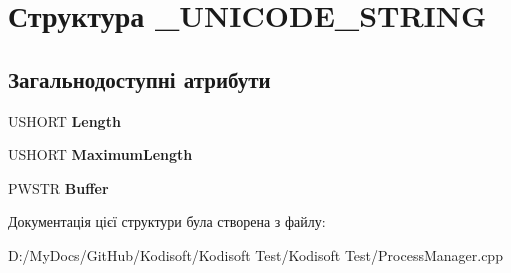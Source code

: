 \hypertarget{struct___u_n_i_c_o_d_e___s_t_r_i_n_g}{\section{Структура \+\_\+\+U\+N\+I\+C\+O\+D\+E\+\_\+\+S\+T\+R\+I\+N\+G}
\label{struct___u_n_i_c_o_d_e___s_t_r_i_n_g}
}
\subsection*{Загальнодоступні атрибути}
\begin{DoxyCompactItemize}
\item 
\hypertarget{struct___u_n_i_c_o_d_e___s_t_r_i_n_g_a3ebb6a85103954fd7fc325ba30c54008}{U\+S\+H\+O\+R\+T {\bfseries Length}}\label{struct___u_n_i_c_o_d_e___s_t_r_i_n_g_a3ebb6a85103954fd7fc325ba30c54008}

\item 
\hypertarget{struct___u_n_i_c_o_d_e___s_t_r_i_n_g_ae0487ecc173e55918bcee834bd3d107b}{U\+S\+H\+O\+R\+T {\bfseries Maximum\+Length}}\label{struct___u_n_i_c_o_d_e___s_t_r_i_n_g_ae0487ecc173e55918bcee834bd3d107b}

\item 
\hypertarget{struct___u_n_i_c_o_d_e___s_t_r_i_n_g_afbc2ba2b7be88d0118e683a2eb289795}{P\+W\+S\+T\+R {\bfseries Buffer}}\label{struct___u_n_i_c_o_d_e___s_t_r_i_n_g_afbc2ba2b7be88d0118e683a2eb289795}

\end{DoxyCompactItemize}


Документація цієї структури була створена з файлу\+:\begin{DoxyCompactItemize}
\item 
D\+:/\+My\+Docs/\+Git\+Hub/\+Kodisoft/\+Kodisoft Test/\+Kodisoft Test/Process\+Manager.\+cpp\end{DoxyCompactItemize}
